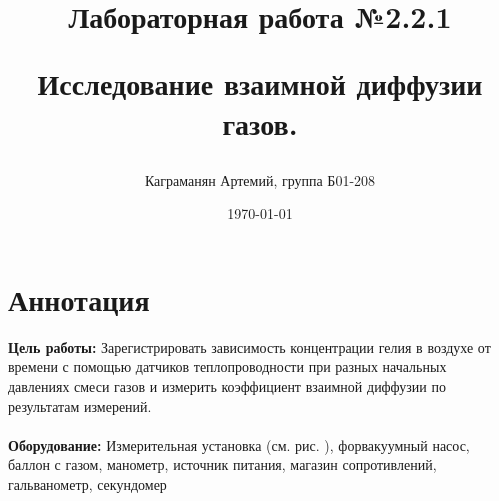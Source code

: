 \documentclass[a4paper, 12pt]{article}
\title{\begin{center}Лабораторная работа №2.2.1\end{center}
Исследование взаимной диффузии газов.}
\author{Каграманян Артемий, группа Б01-208}
\date{\today}
\begin{document}
\maketitle

\section{Аннотация}
\textbf{Цель работы:} Зарегистрировать зависимость концентрации гелия в воздухе от времени с помощью датчиков теплопроводности при разных начальных давлениях смеси газов и измерить коэффициент взаимной диффузии по результатам измерений. \\
\\
\textbf{Оборудование:} Измерительная установка (см. рис. ), форвакуумный насос, баллон с газом, манометр, источник питания, магазин сопротивлений, гальванометр, секундомер
\end{document}
